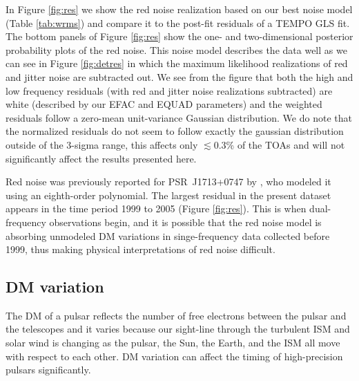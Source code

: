 In Figure \ref{fig:res} we show the red noise realization based on our best
noise model (Table \ref{tab:wrms}) and compare it to the post-fit residuals of
a {\sc TEMPO} GLS fit.
The bottom
panels of Figure \ref{fig:res} show the one- and two-dimensional posterior probability plots
of the red noise. This noise model describes the data well as we can see in
Figure \ref{fig:detres} in which the maximum likelihood realizations of red
and jitter noise are subtracted out. We see from the figure that both the high
and low frequency residuals (with red and jitter noise realizations
subtracted) are white (described by our EFAC and EQUAD parameters) and the
weighted residuals follow a zero-mean unit-variance Gaussian distribution. We
do note that the normalized residuals do not seem to follow exactly the gaussian 
distribution outside of the 3-sigma range, this affects only $\lesssim0.3$\% of the TOAs 
and will not significantly affect the results presented here. 

Red noise was previously reported for PSR~J1713+0747 by \citet{sns+05}, who
modeled it using an eighth-order polynomial. The largest residual in the
present dataset appears in the time period 1999 to 2005 (Figure
\ref{fig:res}). This is when dual-frequency observations begin, and it is
possible that the red noise model is absorbing unmodeled DM variations in
singe-frequency data collected before 1999, thus making physical
interpretations of red noise difficult.





\subsection{DM variation}
\label{sec:dmx}
The DM of a pulsar reflects the number of free electrons between
the pulsar and the telescopes and it varies because
our sight-line through the turbulent ISM and solar wind is changing as the
pulsar, the Sun, the Earth, and the ISM all move with respect to each other.
DM variation can affect the timing of high-precision pulsars significantly.


